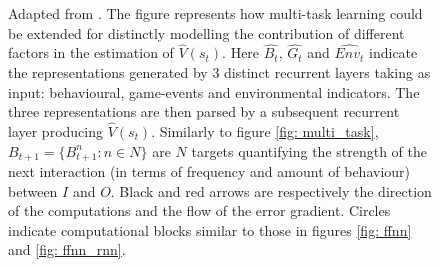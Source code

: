 \begin{figure}
\begin{center}
\begin{adjustbox}{width=0.4\textwidth}
        \end{adjustbox}
    \end{center}
\caption[\textbf{Neural Additive Model applied to a multi-task learning objective}]{Adapted from \cite{bengio2017deep}. The figure represents how multi-task learning could be extended for distinctly modelling the contribution of different factors in the estimation of $\widehat{V}(s_t)$. Here $\widehat{B_t}$, $\widehat{G_t}$ and $\widehat{Env_t}$ indicate the representations generated by 3 distinct recurrent layers taking as input: behavioural, game-events and environmental indicators. The three representations are then parsed by a subsequent recurrent layer producing $\widehat{V}(s_t)$. Similarly to figure \ref{fig: multi_task}, $B_{t+1}=\{B^n_{t+1}: n \in N\}$ are $N$ targets quantifying the strength of the next interaction (in terms of frequency and amount of behaviour)  between $I$ and $O$. Black and red arrows are respectively the direction of the computations and the flow of the error gradient. Circles indicate computational blocks similar to those in figures \ref{fig: ffnn} and \ref{fig: ffnn_rnn}.}
\label{fig: nam_multi_task}
\end{figure}